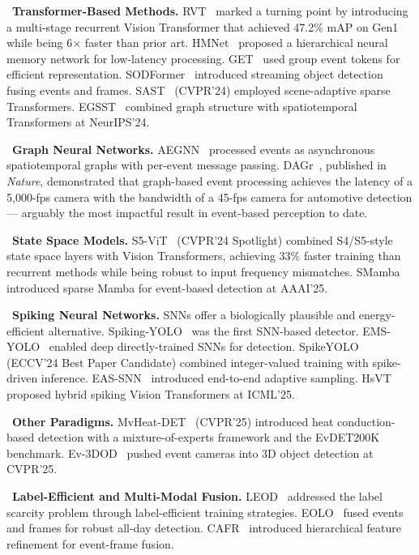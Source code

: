 \noindent{}~\textbf{Transformer-Based Methods.} RVT~\cite{gehrig2023rvt} marked a turning point by introducing a multi-stage recurrent Vision Transformer that achieved 47.2\% mAP on Gen1 while being 6$\times$ faster than prior art. HMNet~\cite{hamaguchi2023hmnet} proposed a hierarchical neural memory network for low-latency processing. GET~\cite{peng2023get} used group event tokens for efficient representation. SODFormer~\cite{zhao2023sodformer} introduced streaming object detection fusing events and frames. SAST~\cite{peng2024sast} (CVPR'24) employed scene-adaptive sparse Transformers. EGSST~\cite{wang2024egsst} combined graph structure with spatiotemporal Transformers at NeurIPS'24.

\noindent{}~\textbf{Graph Neural Networks.} AEGNN~\cite{schaefer2022aegnn} processed events as asynchronous spatiotemporal graphs with per-event message passing. DAGr~\cite{gehrig2024dagr}, published in \textit{Nature}, demonstrated that graph-based event processing achieves the latency of a 5,000-fps camera with the bandwidth of a 45-fps camera for automotive detection --- arguably the most impactful result in event-based perception to date.

\noindent{}~\textbf{State Space Models.} S5-ViT~\cite{zubic2024s5vit} (CVPR'24 Spotlight) combined S4/S5-style state space layers with Vision Transformers, achieving 33\% faster training than recurrent methods while being robust to input frequency mismatches. SMamba~\cite{li2025smamba} introduced sparse Mamba for event-based detection at AAAI'25.

\noindent{}~\textbf{Spiking Neural Networks.} SNNs offer a biologically plausible and energy-efficient alternative. Spiking-YOLO~\cite{kim2020spikingyolo} was the first SNN-based detector. EMS-YOLO~\cite{su2023emsyolo} enabled deep directly-trained SNNs for detection. SpikeYOLO~\cite{li2024spikeyolo} (ECCV'24 Best Paper Candidate) combined integer-valued training with spike-driven inference. EAS-SNN~\cite{wang2024eassnn} introduced end-to-end adaptive sampling. HsVT~\cite{li2025hsvt} proposed hybrid spiking Vision Transformers at ICML'25.

\noindent{}~\textbf{Other Paradigms.} MvHeat-DET~\cite{wang2025mvheat} (CVPR'25) introduced heat conduction-based detection with a mixture-of-experts framework and the EvDET200K benchmark. Ev-3DOD~\cite{li2025ev3dod} pushed event cameras into 3D object detection at CVPR'25.

\noindent{}~\textbf{Label-Efficient and Multi-Modal Fusion.} LEOD~\cite{wu2024leod} addressed the label scarcity problem through label-efficient training strategies. EOLO~\cite{zhou2024eolo} fused events and frames for robust all-day detection. CAFR~\cite{cao2024cafr} introduced hierarchical feature refinement for event-frame fusion.

